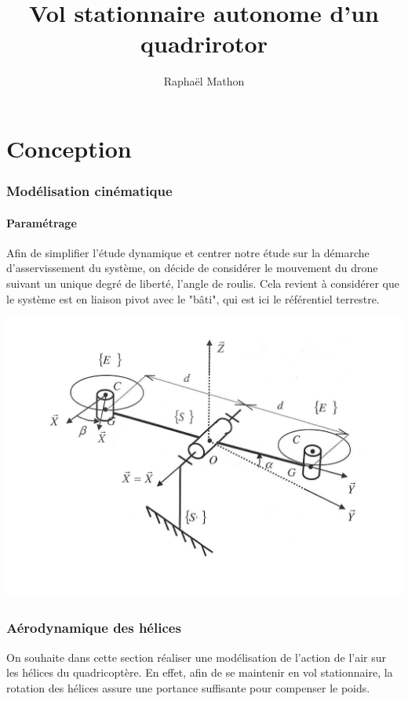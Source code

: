 \documentclass[10pt,a4paper]{article}
\author{Raphaël Mathon}
\title{Vol stationnaire autonome d'un quadrirotor}
\begin{document}
\maketitle

\part{Conception}

\section{Modélisation cinématique}

\subsection{Paramétrage}
Afin de simplifier l'étude dynamique et centrer notre étude sur la démarche d'asservissement du système, on décide de considérer le mouvement du drone suivant un unique degré de liberté, l'angle de roulis. Cela revient à considérer que le système est en liaison pivot avec le "bâti", qui est ici le référentiel terrestre.

\includegraphics[scale=0.4]{schemaCinematique.pdf}

\section{Aérodynamique des hélices}

On souhaite dans cette section réaliser une modélisation de l'action de l'air sur les hélices du quadricoptère. En effet, afin de se maintenir en vol stationnaire, la rotation des hélices assure une portance suffisante pour compenser le poids. 
\end{document}
